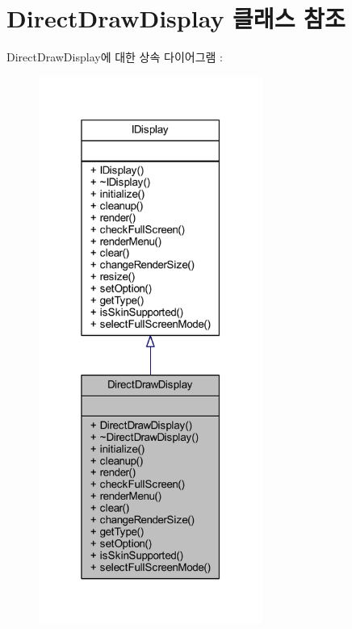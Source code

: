 \hypertarget{class_direct_draw_display}{}\section{Direct\+Draw\+Display 클래스 참조}
\label{class_direct_draw_display}


Direct\+Draw\+Display에 대한 상속 다이어그램 \+: \nopagebreak
\begin{figure}[H]
\begin{center}
\leavevmode
\includegraphics[width=208pt]{class_direct_draw_display__inherit__graph}
\end{center}
\end{figure}


